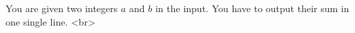 You are given two integers $a$ and $b$ in the input. 
You have to output their sum in one single line. <br>
